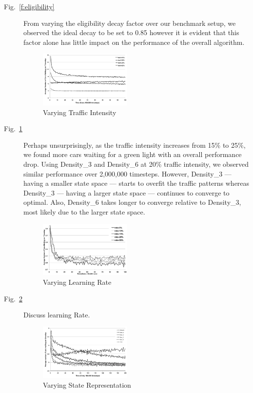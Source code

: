 \begin{description}
\item[Fig.~\ref{f:eligibility}] From varying the eligibility decay factor over
our benchmark setup, we observed the ideal decay to be set to 0.85 however it is
evident that this factor alone has little impact on the performance of the
overall algorithm.

\begin{figure}
\centering
\includegraphics[width=0.45\textwidth]{intensity}
\caption{Varying Traffic Intensity}\label{f:intensity}
\end{figure}

\item[Fig.~\ref{f:intensity}] Perhaps unsurprisingly, as the traffic intensity
increases from 15\% to 25\%, we found more cars waiting for a green light with
an overall performance drop. Using Density\_3 and Density\_6 at 20\% traffic
intensity, we observed similar performance over 2,000,000 timesteps. However,
Density\_3 --- having a smaller state space --- starts to overfit the traffic
patterns whereas Density\_3 --- having a larger state space --- continues to
converge to optimal. Also, Density\_6 takes longer to converge relative to
Density\_3, most likely due to the larger state space.

\begin{figure}
\centering
\includegraphics[width=0.45\textwidth]{learningRate}
\caption{Varying Learning Rate}\label{f:learningRate}
\end{figure}

\item[Fig.~\ref{f:learningRate}]
Discuss learning Rate.

\begin{figure}
\centering
\includegraphics[width=0.45\textwidth]{states}
\caption{Varying State Representation}\label{f:states}
\end{figure}


\end{description}
